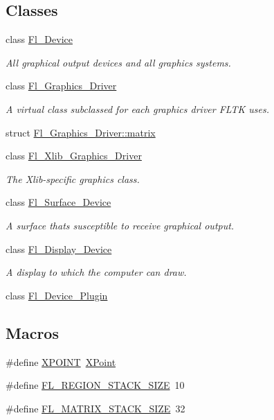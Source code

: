 \subsection*{Classes}
\begin{DoxyCompactItemize}
\item 
class \hyperlink{class_fl___device}{Fl\+\_\+\+Device}
\begin{DoxyCompactList}\small\item\em All graphical output devices and all graphics systems. \end{DoxyCompactList}\item 
class \hyperlink{class_fl___graphics___driver}{Fl\+\_\+\+Graphics\+\_\+\+Driver}
\begin{DoxyCompactList}\small\item\em A virtual class subclassed for each graphics driver F\+L\+TK uses. \end{DoxyCompactList}\item 
struct \hyperlink{struct_fl___graphics___driver_1_1matrix}{Fl\+\_\+\+Graphics\+\_\+\+Driver\+::matrix}
\item 
class \hyperlink{class_fl___xlib___graphics___driver}{Fl\+\_\+\+Xlib\+\_\+\+Graphics\+\_\+\+Driver}
\begin{DoxyCompactList}\small\item\em The Xlib-\/specific graphics class. \end{DoxyCompactList}\item 
class \hyperlink{class_fl___surface___device}{Fl\+\_\+\+Surface\+\_\+\+Device}
\begin{DoxyCompactList}\small\item\em A surface that\textquotesingle{}s susceptible to receive graphical output. \end{DoxyCompactList}\item 
class \hyperlink{class_fl___display___device}{Fl\+\_\+\+Display\+\_\+\+Device}
\begin{DoxyCompactList}\small\item\em A display to which the computer can draw. \end{DoxyCompactList}\item 
class \hyperlink{class_fl___device___plugin}{Fl\+\_\+\+Device\+\_\+\+Plugin}
\end{DoxyCompactItemize}
\subsection*{Macros}
\begin{DoxyCompactItemize}
\item 
\#define \hyperlink{_fl___device_8_h_abcfddf51900f110c482eb02d87432955}{X\+P\+O\+I\+NT}~\hyperlink{win32_8_h_a1ff179578a3389b4f8c2ca9ff5820851}{X\+Point}
\item 
\#define \hyperlink{_fl___device_8_h_a1bcd38908cba66c659bd98b2d791ca55}{F\+L\+\_\+\+R\+E\+G\+I\+O\+N\+\_\+\+S\+T\+A\+C\+K\+\_\+\+S\+I\+ZE}~10
\item 
\#define \hyperlink{_fl___device_8_h_a28fb61d3423470d0c1220ca380551077}{F\+L\+\_\+\+M\+A\+T\+R\+I\+X\+\_\+\+S\+T\+A\+C\+K\+\_\+\+S\+I\+ZE}~32
\end{DoxyCompactItemize}
